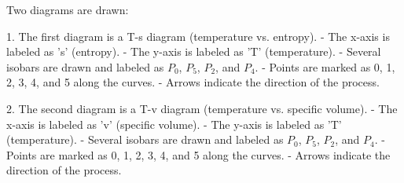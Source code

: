 Two diagrams are drawn:  

1. The first diagram is a T-s diagram (temperature vs. entropy).  
   - The x-axis is labeled as 's' (entropy).  
   - The y-axis is labeled as 'T' (temperature).  
   - Several isobars are drawn and labeled as \( P_0 \), \( P_5 \), \( P_2 \), and \( P_4 \).  
   - Points are marked as 0, 1, 2, 3, 4, and 5 along the curves.  
   - Arrows indicate the direction of the process.  

2. The second diagram is a T-v diagram (temperature vs. specific volume).  
   - The x-axis is labeled as 'v' (specific volume).  
   - The y-axis is labeled as 'T' (temperature).  
   - Several isobars are drawn and labeled as \( P_0 \), \( P_5 \), \( P_2 \), and \( P_4 \).  
   - Points are marked as 0, 1, 2, 3, 4, and 5 along the curves.  
   - Arrows indicate the direction of the process.